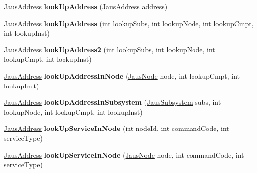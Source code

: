 \begin{DoxyCompactItemize}
\item 
\hypertarget{class_system_tree_aa956c1c4177e65089cd4c8866de53878}{\hyperlink{struct_jaus_address_struct}{\-Jaus\-Address} {\bfseries look\-Up\-Address} (\hyperlink{struct_jaus_address_struct}{\-Jaus\-Address} address)}\label{class_system_tree_aa956c1c4177e65089cd4c8866de53878}

\item 
\hypertarget{class_system_tree_aa92500e9cb1f4624c2d5636d178ea7e1}{\hyperlink{struct_jaus_address_struct}{\-Jaus\-Address} {\bfseries look\-Up\-Address} (int lookup\-Subs, int lookup\-Node, int lookup\-Cmpt, int lookup\-Inst)}\label{class_system_tree_aa92500e9cb1f4624c2d5636d178ea7e1}

\item 
\hypertarget{class_system_tree_a5e76fbe12a54961fc07886e3d7ada680}{\hyperlink{struct_jaus_address_struct}{\-Jaus\-Address} {\bfseries look\-Up\-Address2} (int lookup\-Subs, int lookup\-Node, int lookup\-Cmpt, int lookup\-Inst)}\label{class_system_tree_a5e76fbe12a54961fc07886e3d7ada680}

\item 
\hypertarget{class_system_tree_aaec349452bdee89b321b8edaa3ebef41}{\hyperlink{struct_jaus_address_struct}{\-Jaus\-Address} {\bfseries look\-Up\-Address\-In\-Node} (\hyperlink{struct_jaus_node_struct}{\-Jaus\-Node} node, int lookup\-Cmpt, int lookup\-Inst)}\label{class_system_tree_aaec349452bdee89b321b8edaa3ebef41}

\item 
\hypertarget{class_system_tree_ad0fbffda8153385829466785e5b66520}{\hyperlink{struct_jaus_address_struct}{\-Jaus\-Address} {\bfseries look\-Up\-Address\-In\-Subsystem} (\hyperlink{struct_jaus_subsystem_struct}{\-Jaus\-Subsystem} subs, int lookup\-Node, int lookup\-Cmpt, int lookup\-Inst)}\label{class_system_tree_ad0fbffda8153385829466785e5b66520}

\item 
\hypertarget{class_system_tree_a7bd46004c8fdbbd4ea4c888a4c99b67f}{\hyperlink{struct_jaus_address_struct}{\-Jaus\-Address} {\bfseries look\-Up\-Service\-In\-Node} (int node\-Id, int command\-Code, int service\-Type)}\label{class_system_tree_a7bd46004c8fdbbd4ea4c888a4c99b67f}

\item 
\hypertarget{class_system_tree_a1fe6357ac2df1ab7f34c1b606af4185d}{\hyperlink{struct_jaus_address_struct}{\-Jaus\-Address} {\bfseries look\-Up\-Service\-In\-Node} (\hyperlink{struct_jaus_node_struct}{\-Jaus\-Node} node, int command\-Code, int service\-Type)}\label{class_system_tree_a1fe6357ac2df1ab7f34c1b606af4185d}


\end{DoxyCompactItemize}

